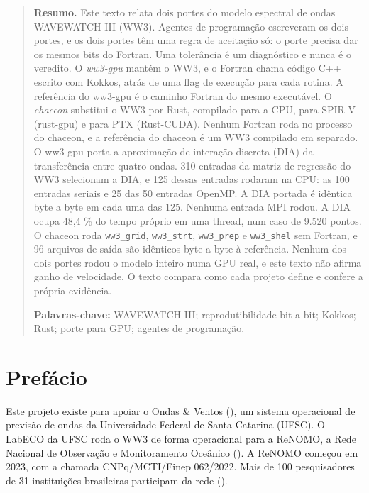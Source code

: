 \documentclass[10pt,a4paper,]{article}
\begin{document}
\begin{quote}
\small\textbf{Resumo.} Este texto relata dois portes do modelo espectral
de ondas WAVEWATCH III (WW3). Agentes de programação escreveram os dois
portes, e os dois portes têm uma regra de aceitação só: o porte precisa
dar os mesmos bits do Fortran. Uma tolerância é um diagnóstico e nunca é
o veredito. O \emph{ww3-gpu} mantém o WW3, e o Fortran chama código C++
escrito com Kokkos, atrás de uma flag de execução para cada rotina. A
referência do ww3-gpu é o caminho Fortran do mesmo executável. O
\emph{chaceon} substitui o WW3 por Rust, compilado para a CPU, para
SPIR-V (rust-gpu) e para PTX (Rust-CUDA). Nenhum Fortran roda no
processo do chaceon, e a referência do chaceon é um WW3 compilado em
separado. O ww3-gpu porta a aproximação de interação discreta (DIA) da
transferência entre quatro ondas. 310 entradas da matriz de regressão do
WW3 selecionam a DIA, e 125 dessas entradas rodaram na CPU: as 100
entradas seriais e 25 das 50 entradas OpenMP. A DIA portada é idêntica
byte a byte em cada uma das 125. Nenhuma entrada MPI rodou. A DIA ocupa
48,4 \% do tempo próprio em uma thread, num caso de 9.520 pontos. O
chaceon roda \texttt{ww3\_grid}, \texttt{ww3\_strt}, \texttt{ww3\_prep}
e \texttt{ww3\_shel} sem Fortran, e 96 arquivos de saída são idênticos
byte a byte à referência. Nenhum dos dois portes rodou o modelo inteiro
numa GPU real, e este texto não afirma ganho de velocidade. O texto
compara como cada projeto define e confere a própria evidência.

\textbf{Palavras-chave:} WAVEWATCH III; reprodutibilidade bit a
bit; Kokkos; Rust; porte para GPU; agentes de programação.
\end{quote}

\section*{Prefácio}\label{prefuxe1cio}

Este projeto existe para apoiar o Ondas \& Ventos
(), um sistema operacional de previsão de ondas da Universidade
Federal de Santa Catarina (UFSC). O LabECO da UFSC roda o WW3 de forma
operacional para a ReNOMO, a Rede Nacional de Observação e Monitoramento
Oceânico (). A ReNOMO começou em
2023, com a chamada CNPq/MCTI/Finep 062/2022. Mais de 100 pesquisadores
de 31 instituições brasileiras participam da rede
().
\end{document}
